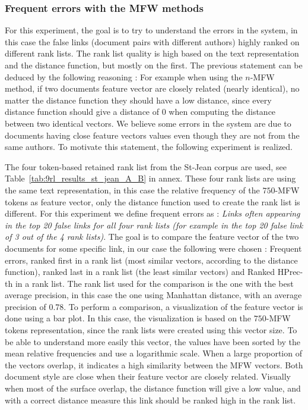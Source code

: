 \subsubsection{Frequent errors with the MFW methods}
\label{sec:frequent_errors}

For this experiment, the goal is to try to understand the errors in the system, in this case the false links (document pairs with different authors) highly ranked on different rank lists.
The rank list quality is high based on the text representation and the distance function, but mostly on the first.
The previous statement can be deduced by the following reasoning : For example when using the $n$-MFW method, if two documents feature vector are closely related (nearly identical), no matter the distance function they should have a low distance, since every distance function should give a distance of 0 when computing the distance between two identical vectors.
We believe some errors in the system are due to documents having close feature vectors values even though they are not from the same authors.
To motivate this statement, the following experiment is realized.

The four token-based retained rank list from the St-Jean corpus are used, see Table~\ref{tab:9rl_results_st_jean_A_B} in annex.
These four rank lists are using the same text representation, in this case the relative frequency of the $750$-MFW tokens as feature vector, only the distance function used to create the rank list is different.
For this experiment we define frequent errors as : \textit{Links often appearing in the top 20 false links for all four rank lists (for example in the top 20 false link of 3 out of the 4 rank lists)}.
The goal is to compare the feature vector of the two documents for some specific link, in our case the following were chosen : Frequent errors, ranked first in a rank list (most similar vectors, according to the distance function), ranked last in a rank list (the least similar vectors) and Ranked HPrec-th in a rank list.
The rank list used for the comparison is the one with the best average precision, in this case the one using Manhattan distance, with an average precision of 0.78.
To perform a comparison, a visualization of the feature vector is done using a bar plot.
In this case, the visualization is based on the $750$-MFW tokens representation, since the rank lists were created using this vector size.
To be able to understand more easily this vector, the values have been sorted by the mean relative frequencies and use a logarithmic scale.
When a large proportion of the vectors overlap, it indicates a high similarity between the MFW vectors.
Both document style are close when their feature vector are closely related.
Visually when most of the surface overlap, the distance function will give a low value, and with a correct distance measure this link should be ranked high in the rank list.

